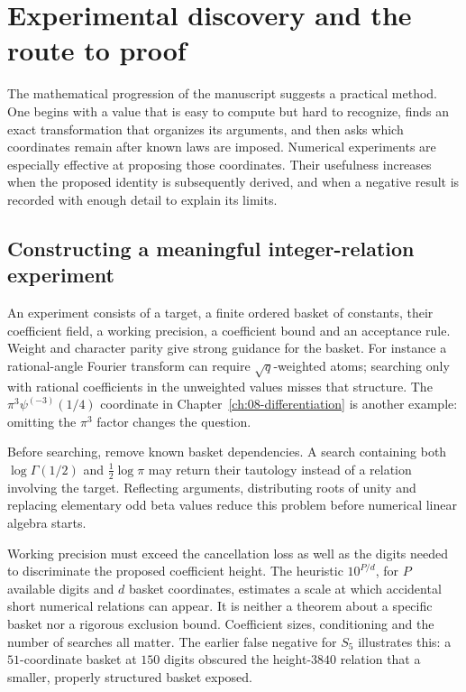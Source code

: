 \chapter{Experimental discovery and the route to proof}\label{ch:10-discovery}
The mathematical progression of the manuscript suggests a practical method.
One begins with a value that is easy to compute but hard to recognize, finds
an exact transformation that organizes its arguments, and then asks which
coordinates remain after known laws are imposed. Numerical experiments are
especially effective at proposing those coordinates. Their usefulness
increases when the proposed identity is subsequently derived, and when a
negative result is recorded with enough detail to explain its limits.

\section{Constructing a meaningful integer-relation experiment}
An experiment consists of a target, a finite ordered basket of constants,
their coefficient field, a working precision, a coefficient bound and an
acceptance rule. Weight and character parity give strong guidance for the
basket. For instance a rational-angle Fourier transform can require
$\sqrt q$-weighted atoms; searching only with rational coefficients in the
unweighted values misses that structure. The
$\pi^3\psi^{(-3)}(1/4)$ coordinate in Chapter~\ref{ch:08-differentiation}
is another example: omitting the $\pi^3$ factor changes the question.

Before searching, remove known basket dependencies. A search containing
both $\log\Gamma(1/2)$ and $\frac12\log\pi$ may return their tautology
instead of a relation involving the target. Reflecting arguments,
distributing roots of unity and replacing elementary odd beta values
reduce this problem before numerical linear algebra starts.

Working precision must exceed the cancellation loss as well as the digits
needed to discriminate the proposed coefficient height. The heuristic
$10^{P/d}$, for $P$ available digits and $d$ basket coordinates, estimates
a scale at which accidental short numerical relations can appear. It is
neither a theorem about a specific basket nor a rigorous exclusion bound.
Coefficient sizes, conditioning and the number of searches all matter.
The earlier false negative for $S_5$ illustrates this: a $51$-coordinate
basket at $150$ digits obscured the height-$3840$ relation that a smaller,
properly structured basket exposed.

